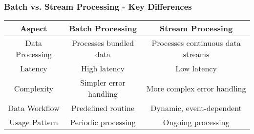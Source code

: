 \documentclass[aspectratio=169]{beamer}
\begin{document}
\begin{frame}[fragile]
    \frametitle{Batch vs. Stream Processing - Key Differences}
    \begin{center}
        \begin{tabular}{|c|c|c|}
            \hline
            \textbf{Aspect} & \textbf{Batch Processing} & \textbf{Stream Processing} \\
            \hline
            Data Processing & Processes bundled data & Processes continuous data streams \\
            \hline
            Latency & High latency & Low latency \\
            \hline
            Complexity & Simpler error handling & More complex error handling \\
            \hline
            Data Workflow & Predefined routine & Dynamic, event-dependent \\
            \hline
            Usage Pattern & Periodic processing & Ongoing processing \\
            \hline
        \end{tabular}
    \end{center}
\end{frame}
\end{document}
